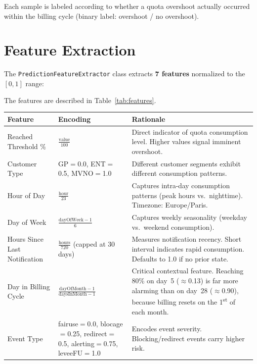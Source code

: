 Each sample is labeled according to whether a quota overshoot actually occurred within the billing cycle (binary label: overshoot / no overshoot).


\section{Feature Extraction}

The \texttt{PredictionFeatureExtractor} class extracts \textbf{7 features} normalized to the $[0, 1]$ range:

The features are described in Table~\ref{tab:features}.

\begin{center}
    \justifying
    \begin{tabularx}{\textwidth}{|p{2.5cm}|p{3.5cm}|X|}
\toprule
\textbf{Feature} & \textbf{Encoding} & \textbf{Rationale} \\
\midrule
Reached Threshold \% & $\frac{\text{value}}{100}$ &
Direct indicator of quota consumption level.
Higher values signal imminent overshoot. \\
\hline
Customer Type & GP$=$0.0, ENT$=$0.5, MVNO$=$1.0 &
Different customer segments exhibit different consumption patterns. \\
\hline
Hour of Day & $\frac{\text{hour}}{23}$ &
Captures intra-day consumption patterns (peak hours vs.\ nighttime).
Timezone: Europe/Paris. \\
\hline
Day of Week & $\frac{\text{dayOfWeek} - 1}{6}$ &
Captures weekly seasonality (weekday vs.\ weekend consumption). \\
\hline
Hours Since Last Notification & $\frac{\text{hours}}{720}$ (capped at 30 days) &
Measures notification recency. Short interval indicates rapid consumption. Defaults to 1.0 if no prior state. \\
\hline
Day in Billing Cycle & $\frac{\text{dayOfMonth} - 1}{\text{daysInMonth} - 1}$ &
Critical contextual feature. Reaching 80\% on day~5 ($\approx$0.13) is far more alarming than on day~28 ($\approx$0.90), because billing resets on the 1\textsuperscript{st} of each month. \\
\hline
Event Type & fairuse$=$0.0, blocage$=$0.25, redirect$=$0.5, alerting$=$0.75, leveeFU$=$1.0 &
Encodes event severity. Blocking/redirect events carry higher risk. \\
\bottomrule
    \end{tabularx}
    \label{tab:features}
\end{center}

